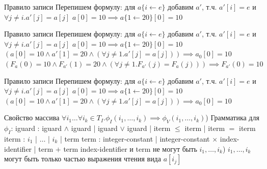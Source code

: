 \documentclass{beamer}
\begin{document}
\begin{frame}{Правило записи}
Перепишем формулу:\newline
для $a\{i\leftarrow e\}$ добавим $a'$, т.ч. $a'[i] = e$ и $\forall j\ne i. a'[j] = a[j]$\newline
$a[0] = 10 \implies a\{1 \leftarrow 20\}[0] = 10$\newline
\end{frame}

\begin{frame}{Правило записи}
Перепишем формулу:\newline
для $a\{i\leftarrow e\}$ добавим $a'$, т.ч. $a'[i] = e$ и $\forall j\ne i. a'[j] = a[j]$\newline
$a[0] = 10 \implies a\{1 \leftarrow 20\}[0] = 10$\newline
$(a[0] = 10 \wedge a'[1] = 20 \wedge (\forall j \ne 1. a'[j] = a[j])) \implies a_0[0] = 10$\newline
$(F_a(0) = 10 \wedge F_{a'}(1) = 20 \wedge (\forall j \ne 1. F_{a'}(j) = F_a(j))) \implies F_{a'}(0) = 10$\newline
\end{frame}

\begin{frame}{Правило записи}
Перепишем формулу:\newline
для $a\{i\leftarrow e\}$ добавим $a'$, т.ч. $a'[i] = e$ и $\forall j\ne i. a'[j] = a[j]$\newline
$a[0] = 10 \implies a\{1 \leftarrow 20\}[0] = 10$\newline
$(a[0] = 10 \wedge a'[1] = 20 \wedge (\forall j \ne 1. a'[j] = a[j])) \implies a_0[0] = 10$\newline
\end{frame}

\begin{frame}{Свойство массива}
$\forall i_1 \dots \forall i_k \in T_I. \phi_I(i_1, \dots, i_k) \implies \phi_V(i_1, \dots, i_k)$) Грамматика для $\phi_I$:\newline
iguard : iguard $\wedge$ iguard | iguard $\vee$ iguard | iterm $\le$ iterm | iterm $=$ iterm\newline
iterm : $i_1$ | $\dots$ | $i_k$ | term\newline
term : integer-constant | integer-constant $\times$ index-identifier | term $+$ term\newline
index-identifier и term не могут быть $i_1, \dots, i_k$) $i_1, \dots, i_k$ могут быть только частью выражения чтения вида $a[i_j]$\newline
\end{frame}
\end{document}
